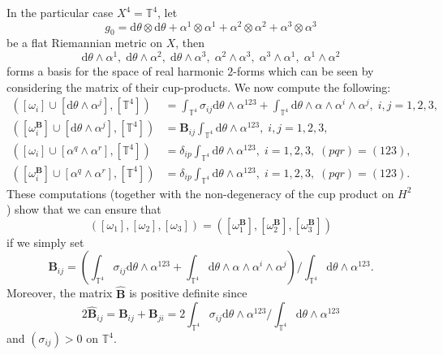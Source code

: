 \documentclass[11pt]{amsart}
\theoremstyle{plain}
\theoremstyle{definition}
\theoremstyle{plain}
\theoremstyle{definition}
\numberwithin{equation}{section}
\numberwithin{theorem}{section}
\begin{document}
In the particular case $X^4=\mathbb{T}^4$, let 	
\[
g_0
=\mathrm{d}\theta\otimes \mathrm{d}\theta 
+ 
\alpha^1\otimes \alpha^1 + \alpha^2\otimes \alpha^2+\alpha^3\otimes \alpha^3
\]
be a flat Riemannian metric on $X$, then 
\[
\mathrm{d}\theta \wedge \alpha^1, \;
\mathrm{d}\theta \wedge \alpha^2, \;
\mathrm{d}\theta \wedge \alpha^3,\;
\alpha^2\wedge\alpha^3,\;
\alpha^3\wedge \alpha^1,\;
\alpha^1\wedge \alpha^2
\]
forms a basis for the space of real harmonic $2$-forms which can be seen by considering the matrix of their cup-products. We now compute the following:
\begin{align*}
\left(\left[\omega_i\right]\cup \left[\mathrm{d}\theta\wedge \alpha^j\right], \left[\mathbb{T}^4\right]\right)
& = 
\int_{\mathbb{T}^4} \sigma_{ij}\mathrm{d}\theta \wedge \alpha^{123}
+ 
\int_{\mathbb{T}^4} \mathrm{d}\theta \wedge\alpha\wedge\alpha^i\wedge\alpha^j,\; i,j=1,2,3, \\
\left(\left[\omega_i^\mathbf{B}\right]\cup \left[\mathrm{d}\theta\wedge\alpha^j\right], \left[\mathbb{T}^4\right]\right)
& = 
\mathbf{B}_{ij}\int_{\mathbb{T}^4} \mathrm{d}\theta \wedge\alpha^{123},\; i,j=1,2,3,\\
\left( \left[\omega_i\right]\cup \left[\alpha^q\wedge\alpha^r\right], \left[\mathbb{T}^4\right]\right)
& = 
\delta_{ip}\int_{\mathbb{T}^4} \mathrm{d}\theta \wedge \alpha^{123}, \; i=1,2,3,\; (pqr)=(123),\\
\left( \left[\omega_i^\mathbf{B}\right]\cup \left[\alpha^q\wedge\alpha^r\right], \left[\mathbb{T}^4\right]\right)
& = 
\delta_{ip}\int_{\mathbb{T}^4} \mathrm{d}\theta \wedge\alpha^{123},\; i=1,2,3, \; (pqr)=(123).
\end{align*}
These computations (together with the non-degeneracy of the cup product on $H^2$) show that we can ensure that
\[
\left(\left[\omega_1\right],\left[\omega_2\right],\left[\omega_3\right]\right) 
= 
\left( \left[\omega_1^\mathbf{B}\right],\left[\omega_2^\mathbf{B}\right],\left[\omega_3^\mathbf{B}\right]\right)
\]
if we simply set 
\begin{equation}
\label{def:B}
\mathbf{B}_{ij}
= 
\left(\int_{\mathbb{T}^4} \sigma_{ij}\mathrm{d}\theta \wedge \alpha^{123}
+ 
\int_{\mathbb{T}^4} \mathrm{d}\theta \wedge\alpha\wedge\alpha^i\wedge\alpha^j\right)/\int_{\mathbb{T}^4}\mathrm{d}\theta\wedge\alpha^{123}.
\end{equation}
Moreover, the matrix $\widehat{\mathbf{B}}$ is positive definite since
\[
2\widehat{\mathbf{B}}_{ij}
= \mathbf{B}_{ij}
+ 
\mathbf{B}_{ji}
= 
2\int_{\mathbb{T}^4}\sigma_{ij}\mathrm{d}\theta \wedge\alpha^{123}/\int_{\mathbb{T}^4}\mathrm{d}\theta\wedge\alpha^{123}
\]
and $\left(\sigma_{ij}\right)>0$ on $\mathbb{T}^4$. 
\end{document}
